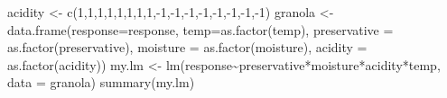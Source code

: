 \documentclass[
]{book}
\newenvironment{Shaded}{\begin{snugshade}}{\end{snugshade}}
\newcommand{\AttributeTok}[1]{\textcolor[rgb]{0.77,0.63,0.00}{#1}}
\newcommand{\DecValTok}[1]{\textcolor[rgb]{0.00,0.00,0.81}{#1}}
\newcommand{\FunctionTok}[1]{\textcolor[rgb]{0.00,0.00,0.00}{#1}}
\newcommand{\NormalTok}[1]{#1}
\newcommand{\OtherTok}[1]{\textcolor[rgb]{0.56,0.35,0.01}{#1}}
\newcommand{\SpecialCharTok}[1]{\textcolor[rgb]{0.00,0.00,0.00}{#1}}
\begin{document}
\begin{Shaded}
\begin{Highlighting}[]
\NormalTok{acidity }\OtherTok{\textless{}{-}} \FunctionTok{c}\NormalTok{(}\DecValTok{1}\NormalTok{,}\DecValTok{1}\NormalTok{,}\DecValTok{1}\NormalTok{,}\DecValTok{1}\NormalTok{,}\DecValTok{1}\NormalTok{,}\DecValTok{1}\NormalTok{,}\DecValTok{1}\NormalTok{,}\DecValTok{1}\NormalTok{,}\SpecialCharTok{{-}}\DecValTok{1}\NormalTok{,}\SpecialCharTok{{-}}\DecValTok{1}\NormalTok{,}\SpecialCharTok{{-}}\DecValTok{1}\NormalTok{,}\SpecialCharTok{{-}}\DecValTok{1}\NormalTok{,}\SpecialCharTok{{-}}\DecValTok{1}\NormalTok{,}\SpecialCharTok{{-}}\DecValTok{1}\NormalTok{,}\SpecialCharTok{{-}}\DecValTok{1}\NormalTok{,}\SpecialCharTok{{-}}\DecValTok{1}\NormalTok{)}
\NormalTok{granola }\OtherTok{\textless{}{-}} \FunctionTok{data.frame}\NormalTok{(}\AttributeTok{response=}\NormalTok{response, }\AttributeTok{temp=}\FunctionTok{as.factor}\NormalTok{(temp), }\AttributeTok{preservative =} \FunctionTok{as.factor}\NormalTok{(preservative), }\AttributeTok{moisture =} \FunctionTok{as.factor}\NormalTok{(moisture), }\AttributeTok{acidity =} \FunctionTok{as.factor}\NormalTok{(acidity))}
\NormalTok{my.lm }\OtherTok{\textless{}{-}} \FunctionTok{lm}\NormalTok{(response}\SpecialCharTok{\textasciitilde{}}\NormalTok{preservative}\SpecialCharTok{*}\NormalTok{moisture}\SpecialCharTok{*}\NormalTok{acidity}\SpecialCharTok{*}\NormalTok{temp, }\AttributeTok{data =}\NormalTok{ granola)}
\FunctionTok{summary}\NormalTok{(my.lm)}
\end{Highlighting}
\end{Shaded}
\end{document}
